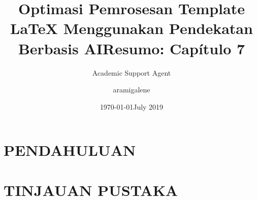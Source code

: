 \documentclass{article}
\title{Optimasi Pemrosesan Template LaTeX Menggunakan Pendekatan Berbasis AI}
\author{Academic Support Agent}
\date{\today}
\begin{document}
\maketitle

\begin{abstract}

\end{abstract}

\chapter{PENDAHULUAN}


\chapter{TINJAUAN PUSTAKA}


\usepackage[utf8]{inputenc}

\title{Resumo: Capítulo 7}
\author{aramigalene }
\date{July 2019}
\end{document}
